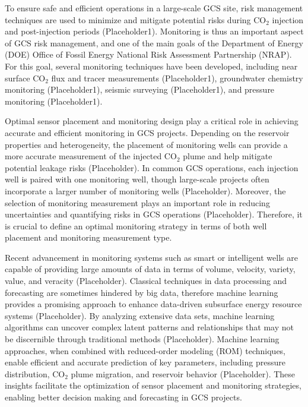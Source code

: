 \documentclass[10pt, twoside]{article}
\begin{document}
To ensure safe and efficient operations in a large-scale GCS site, risk management techniques are used to minimize and mitigate potential risks during CO$_2$ injection and post-injection periods (Placeholder1). Monitoring is thus an important aspect of GCS risk management, and one of the main goals of the Department of Energy (DOE) Office of Fossil Energy National Risk Assessment Partnership (NRAP). For this goal, several monitoring techniques have been developed, including near surface CO$_2$ flux and tracer measurements (Placeholder1), groundwater chemistry monitoring (Placeholder1), seismic surveying (Placeholder1), and pressure monitoring (Placeholder1). 

Optimal sensor placement and monitoring design play a critical role in achieving accurate and efficient monitoring in GCS projects. Depending on the reservoir properties and heterogeneity, the placement of monitoring wells can provide a more accurate measurement of the injected CO$_2$ plume and help mitigate potential leakage risks (Placeholder). In common GCS operations, each injection well is paired with one monitoring well, though large-scale projects often incorporate a larger number of monitoring wells (Placeholder). Moreover, the selection of monitoring measurement plays an important role in reducing uncertainties and quantifying risks in GCS operations (Placeholder). Therefore, it is crucial to define an optimal monitoring strategy in terms of both well placement and monitoring measurement type. 

Recent advancement in monitoring systems such as smart or intelligent wells are capable of providing large amounts of data in terms of volume, velocity, variety, value, and veracity (Placeholder). Classical techniques in data processing and forecasting are sometimes hindered by big data, therefore machine learning provides a promising approach to enhance data-driven subsurface energy resource systems (Placeholder). By analyzing extensive data sets, machine learning algorithms can uncover complex latent patterns and relationships that may not be discernible through traditional methods (Placeholder). Machine learning approaches, when combined with reduced-order modeling (ROM) techniques, enable efficient and accurate prediction of key parameters, including pressure distribution, CO$_2$ plume migration, and reservoir behavior (Placeholder). These insights facilitate the optimization of sensor placement and monitoring strategies, enabling better decision making and forecasting in GCS projects.
\end{document}
